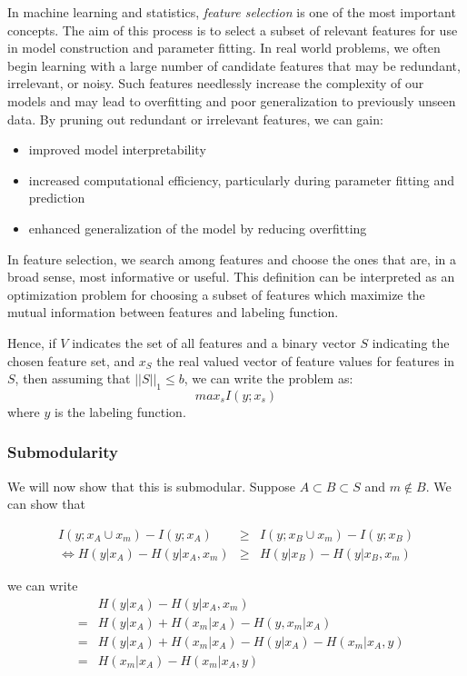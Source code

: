 In machine learning and statistics, \textit{feature selection} is one of the most important concepts. The aim of this process is to select a subset of relevant features for use in model construction and parameter fitting.  In real world problems, we often begin learning with a large number of candidate features that may be redundant, irrelevant, or noisy. Such features needlessly increase the complexity of our models and may lead to overfitting and poor generalization to previously unseen data. By pruning out redundant or irrelevant features, we can gain:
\begin{itemize}
\item improved model interpretability
\item increased computational efficiency, particularly during parameter fitting and prediction
\item enhanced generalization of the model by reducing overfitting
\end{itemize} 

In feature selection, we search among features and choose the ones that are, in a broad sense, most informative or useful. This definition can be interpreted as an optimization problem for choosing a subset of features which maximize the mutual information between features and labeling function.

Hence, if $V$ indicates the set of all features and a binary vector $S$ indicating the chosen feature set, and $x_S$ the real valued vector of feature values for features in $S$, then assuming that $||S||_1 \leq b$, we can write the problem as:
\begin{equation*}
max_s I(y;x_s)
\end{equation*} 
where $y$ is the labeling function.

\subsubsection{Submodularity}

We will now show that this is submodular. Suppose $A \subset B \subset S$ and $m \not \in B$. We can show that

\begin{eqnarray}
I(y;x_A \cup x_m) - I(y;x_A) &\geq & I(y;x_B \cup x_m) - I(y;x_B) \nonumber \\
\Leftrightarrow H(y|x_A)-H(y|x_A,x_m) &\geq & H(y|x_B)-H(y|x_B,x_m) \label{f1}
\end{eqnarray}
  
 we can write
\begin{eqnarray} 
	&&H(y|x_A)-H(y|x_A,x_m) \nonumber \\
	&=&H(y|x_A)+ H(x_m|x_A)-H(y,x_m|x_A)\nonumber \\
	&=&H(y|x_A)+ H(x_m|x_A) -H(y|x_A) - H(x_m|x_A,y)\nonumber \\
	&=& H(x_m|x_A)- H(x_m|x_A,y) \label{f2}
\end{eqnarray} 

